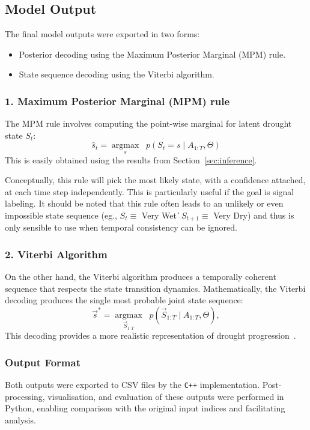 \subsection{Model Output}

The final model outputs were exported in two forms:
\begin{itemize}
    \item Posterior decoding using the Maximum Posterior Marginal (MPM) rule.
    \item State sequence decoding using the Viterbi algorithm.
\end{itemize}

\subsubsection{1. Maximum Posterior Marginal (MPM) rule}

The MPM rule involves computing the point-wise marginal for latent drought state $S_t$:
\[
    \hat{s}_t = \underset{s}{\operatorname{argmax}} \;\; p(S_t = s \mid A_{1:T}, \Theta)
\]
This is easily obtained using the results from Section~\ref{sec:inference}.

Conceptually, this rule will pick the most likely state, with a confidence attached, at each time step independently. This is particularly useful if the goal is signal labeling. It should be noted that this rule often leads to an unlikely or even impossible state sequence (eg., $S_t \equiv$ Very Wet \|\; $S_{t+1} \equiv$ Very Dry) and thus is only sensible to use when temporal consistency can be ignored. 

\subsubsection{2. Viterbi Algorithm}
On the other hand, the Viterbi algorithm produces a temporally coherent sequence that respects the state transition dynamics. Mathematically, the Viterbi decoding produces the single most probable joint state sequence:
\[
    \vec{s}^* = \underset{\vec{S}_{1:T}}{\operatorname{argmax}} \;\; p(\vec{S}_{1:T}\mid A_{1:T}, \Theta),
\]
This decoding provides a more realistic representation of drought progression~\cite{viterbi}.  

\subsubsection{Output Format}
Both outputs were exported to CSV files by the \texttt{C++} implementation. Post-processing, visualisation, and evaluation of these outputs were performed in Python, enabling comparison with the original input indices and facilitating analysis.
